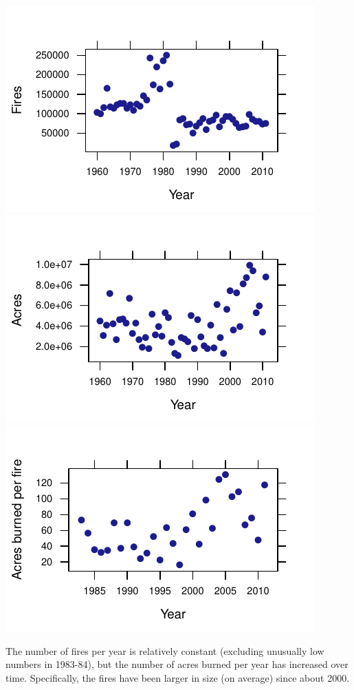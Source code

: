 \documentclass[twoside]{book}\usepackage[]{graphicx}\usepackage[]{xcolor}
\makeatletter
\def\maxwidth{ %
  \ifdim\Gin@nat@width>\linewidth
    \linewidth
  \else
    \Gin@nat@width
  \fi
}
\newenvironment{knitrout}{}{} %
\makeatother
\begin{document}
\begin{solution}
\begin{knitrout}
{\centering \includegraphics[width=\maxwidth]{figures/fig-unnamed-chunk-31-1} 
\includegraphics[width=\maxwidth]{figures/fig-unnamed-chunk-31-2} 
\includegraphics[width=\maxwidth]{figures/fig-unnamed-chunk-31-3} 

}



\end{knitrout}

The number of fires per year is relatively constant (excluding unusually low numbers in 1983-84), but the number of acres burned per year has increased over time.  Specifically, the fires have been larger in size (on average) since about 2000.
\end{solution}
\end{document}
